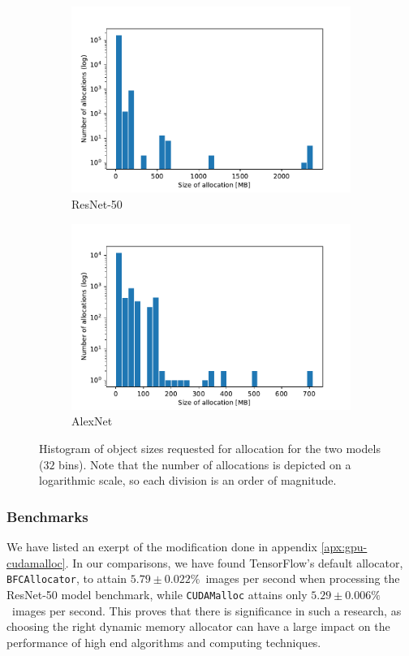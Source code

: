 \documentclass[12pt,twoside]{article}
\newcommand{\resnettimebfc}{$5.79\pm0.022\%$}     %
\newcommand{\resnettimecuda}{$5.29\pm0.006\%$}    %
\begin{document}
\begin{figure}[!ht]
  \centering
  \begin{subfigure}[b]{0.49\textwidth}
    \includegraphics[width=\textwidth]{../Quantitative_Python/ResNet-50_hist_MB_ylog.pdf}
    \caption{ResNet-50}
  \end{subfigure}
  \begin{subfigure}[b]{0.49\textwidth}
    \includegraphics[width=\textwidth]{../Quantitative_Python/AlexNet_hist_MB_ylog.pdf}
    \caption{AlexNet}
  \end{subfigure}
  \caption{Histogram of object sizes requested for allocation for the two models ($32$ bins). Note that the number of allocations is depicted on a logarithmic scale, so each division is an order of magnitude.}
  \label{fig:hist}
\end{figure}

\subsubsection*{Benchmarks}
We have listed an exerpt of the modification done in appendix \ref{apx:gpu-cudamalloc}. In our comparisons, we have found TensorFlow's default allocator, \texttt{BFCAllocator}, to attain \resnettimebfc\ images per second when processing the ResNet-50 model benchmark, while \texttt{CUDAMalloc} attains only \resnettimecuda\ images per second. This proves that there is significance in such a research, as choosing the right dynamic memory allocator can have a large impact on the performance of high end algorithms and computing techniques.
\end{document}
